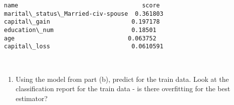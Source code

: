 \documentclass[11pt]{article}
\providecommand{\tightlist}{%
      \setlength{\itemsep}{0pt}\setlength{\parskip}{0pt}}
\begin{document}
    \begin{Verbatim}[commandchars=\\\{\}]
name                                   score
marital\_status\_Married-civ-spouse  0.361803
capital\_gain                       0.197178
education\_num                      0.18501
age                                0.063752
capital\_loss                       0.0610591

    \end{Verbatim}

    \begin{center}
    \end{center}
    { \hspace*{\fill} \\}
    
    \begin{enumerate}
\def\labelenumi{\alph{enumi})}
\setcounter{enumi}{5}
\tightlist
\item
  Using the model from part (b), predict for the train data. Look at the
  classification report for the train data - is there overfitting for
  the best estimator?
\end{enumerate}
\end{document}
